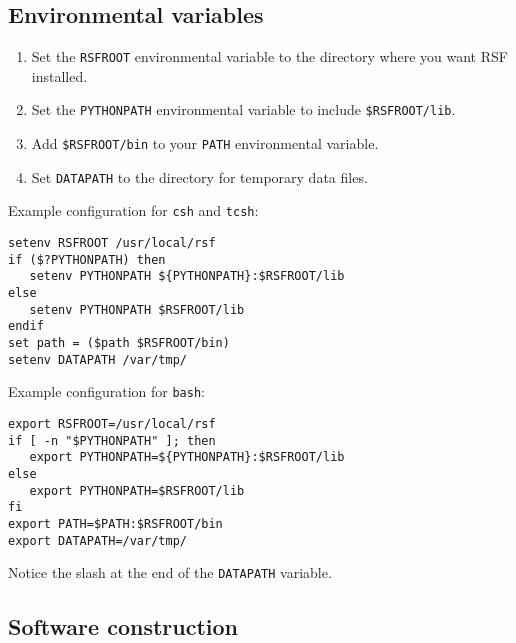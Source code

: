 \subsection{Environmental variables}

\begin{enumerate}
\item  Set the \texttt{RSFROOT} environmental variable to the directory where you want RSF installed.
\item Set the \texttt{PYTHONPATH} environmental variable to include \texttt{\$RSFROOT/lib}. 
\item Add \texttt{\$RSFROOT/bin} to your \texttt{PATH} environmental variable.
\item Set \texttt{DATAPATH} to the directory for temporary data files. 
\end{enumerate}

Example configuration for \texttt{csh} and \texttt{tcsh}:
\begin{verbatim}
setenv RSFROOT /usr/local/rsf
if ($?PYTHONPATH) then
   setenv PYTHONPATH ${PYTHONPATH}:$RSFROOT/lib
else
   setenv PYTHONPATH $RSFROOT/lib
endif
set path = ($path $RSFROOT/bin)
setenv DATAPATH /var/tmp/
\end{verbatim}

Example configuration for \texttt{bash}:
\begin{verbatim}
export RSFROOT=/usr/local/rsf
if [ -n "$PYTHONPATH" ]; then
   export PYTHONPATH=${PYTHONPATH}:$RSFROOT/lib
else
   export PYTHONPATH=$RSFROOT/lib
fi
export PATH=$PATH:$RSFROOT/bin
export DATAPATH=/var/tmp/
\end{verbatim}

Notice the slash at the end of the \texttt{DATAPATH} variable.

\subsection{Software construction}

